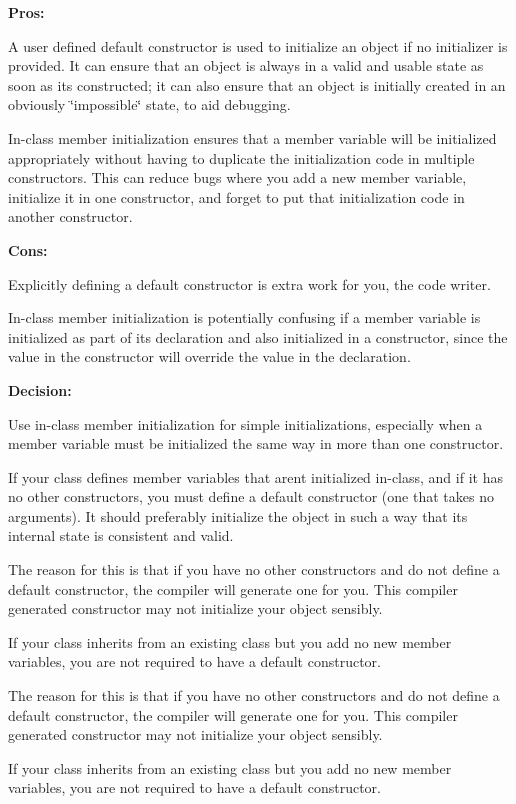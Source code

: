{\bfseries Pros\+:}

A user defined default constructor is used to initialize an object if no initializer is provided. It can ensure that an object is always in a valid and usable state as soon as it\textquotesingle{}s constructed; it can also ensure that an object is initially created in an obviously \char`\"{}impossible\char`\"{} state, to aid debugging.

In-\/class member initialization ensures that a member variable will be initialized appropriately without having to duplicate the initialization code in multiple constructors. This can reduce bugs where you add a new member variable, initialize it in one constructor, and forget to put that initialization code in another constructor.

{\bfseries Cons\+:}

Explicitly defining a default constructor is extra work for you, the code writer.

In-\/class member initialization is potentially confusing if a member variable is initialized as part of its declaration and also initialized in a constructor, since the value in the constructor will override the value in the declaration.

{\bfseries Decision\+:}

Use in-\/class member initialization for simple initializations, especially when a member variable must be initialized the same way in more than one constructor.

If your class defines member variables that aren\textquotesingle{}t initialized in-\/class, and if it has no other constructors, you must define a default constructor (one that takes no arguments). It should preferably initialize the object in such a way that its internal state is consistent and valid.

The reason for this is that if you have no other constructors and do not define a default constructor, the compiler will generate one for you. This compiler generated constructor may not initialize your object sensibly.

If your class inherits from an existing class but you add no new member variables, you are not required to have a default constructor.

The reason for this is that if you have no other constructors and do not define a default constructor, the compiler will generate one for you. This compiler generated constructor may not initialize your object sensibly.

If your class inherits from an existing class but you add no new member variables, you are not required to have a default constructor.

